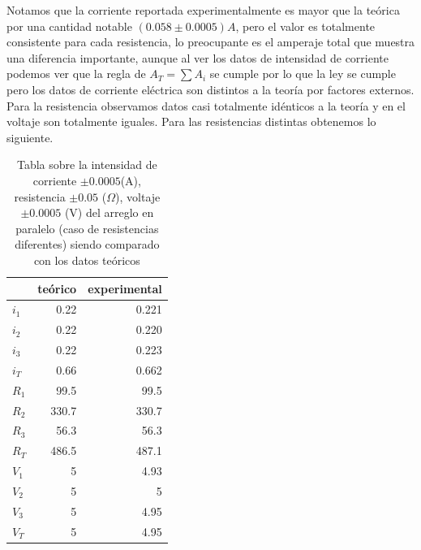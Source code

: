 \documentclass[article,12pt]{elsarticle}
\begin{document}
Notamos que la corriente reportada experimentalmente es mayor que la teórica por una cantidad notable $(0.058 \pm 0.0005)A$, pero el valor es totalmente consistente para cada resistencia, lo preocupante es el amperaje total que muestra una diferencia importante, aunque al ver los datos de intensidad de corriente podemos ver que la regla de $A_T = \sum A_i$ se cumple por lo que la ley se cumple pero los datos de corriente eléctrica son distintos a la teoría por factores externos. Para la resistencia observamos datos casi totalmente idénticos a la teoría y en el voltaje son totalmente iguales.
\newpage
Para las resistencias distintas obtenemos lo siguiente.
\begin{table}[h]
\centering
\begin{tabular}{|l|r|r|}
\hline
     & \multicolumn{1}{l|}{teórico} & \multicolumn{1}{l|}{experimental} \\ \hline
$i_1$ & 0.22                         & 0.221                             \\ \hline
$i_2$ & 0.22                         & 0.220                              \\ \hline
$i_3$ & 0.22                         & 0.223                             \\ \hline
$i_T$ & 0.66                         & 0.662                             \\ \hline
$R_1$ & 99.5                         & 99.5                              \\ \hline
$R_2$ & 330.7                        & 330.7                             \\ \hline
$R_3$ & 56.3                         & 56.3                              \\ \hline
$R_T$ & 486.5                        & 487.1                             \\ \hline
$V_1$ & 5                            & 4.93                              \\ \hline
$V_2$ & 5                            & 5                                 \\ \hline
$V_3$ & 5                            & 4.95                              \\ \hline
$V_T$ & 5                            & 4.95                              \\ \hline
\end{tabular}
\caption{Tabla sobre la intensidad de corriente $\pm 0.0005$(A), resistencia $\pm 0.05$ ($\Omega$), voltaje $\pm 0.0005$ (V) del arreglo en paralelo (caso de resistencias diferentes) siendo comparado con los datos teóricos}
\end{table}
\end{document}
